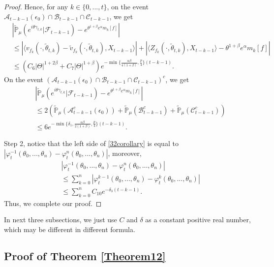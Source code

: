 \documentclass[12pt, a4paper]{amsart}
\theoremstyle{definition}
\numberwithin{equation}{section}
\begin{document}
\begin{proof}
Hence, for any $k\in\{0,...,t\}$, on the event $\mathcal{A}_{t-k-1}(\epsilon_0)\cap\mathcal{B}_{t-k-1}\cap\mathcal{C}_{t-k-1}$, we get
\begin{align*}
   &\left|\mathbb{\tilde{P}}_{\mu}\left(e^{i\theta \gamma_{t,k}}|\mathcal{F}_{t-k-1}\right)-e^{\theta^{1+\beta}e^{\alpha}m_k[f]}\right|\\
   &\leq \left|\langle v_{f_k}(\cdot,\tilde{\theta}_{t,k})-\tilde{v}_{f_k}(\cdot,\tilde{\theta}_{t,k}), X_{t-k-1}\rangle\right|
   +\left|\langle Z_{f_k}(\cdot,\tilde{\theta}_{t,k}),X_{t-k-1}\rangle-\theta^{1+\beta}e^{\alpha}m_k[f]\right|\\
   &\leq (C_6|\Theta|^{1+2\beta}+C_7|\Theta|^{1+\beta}) e^{-\min\{\frac{\alpha\beta}{4(1+\beta)},\frac{p}{4}\}(t-k-1)}.
\end{align*}
On the event $(\mathcal{A}_{t-k-1}(\epsilon_0)\cap\mathcal{B}_{t-k-1}\cap\mathcal{C}_{t-k-1})^c$, we get
\begin{align*}
    &\left|\mathbb{\tilde{P}}_{\mu}\left(e^{i\theta \gamma_{t,k}}|\mathcal{F}_{t-k-1}\right)-e^{\theta^{1+\beta}e^{\alpha}m_k[f]}\right|\\
    &\leq 2(\mathbb{\tilde{P}}_{\mu}(\mathcal{A}^c_{t-k-1}(\epsilon_0))+\mathbb{\tilde{P}}_{\mu}(\mathcal{B}^c_{t-k-1})+\mathbb{\tilde{P}}_{\mu}(\mathcal{C}^c_{t-k-1}))\\
    &\leq 6e^{-\min\{\delta_1,\frac{\alpha\beta}{2(1+\beta)},\frac{p}{4}\}(t-k-1)}.
\end{align*}

Step 2, notice that the left side of \eqref{32corollary} is equal to $\left|\varphi^{-1}_t(\theta_0,...,\theta_n)-\varphi^{n}_t(\theta_0,...,\theta_n)\right|$, moreover,
\begin{align}
    &\left|\varphi^{-1}_t(\theta_0,...,\theta_n)-\varphi^{n}_t(\theta_0,...,\theta_n)\right|
    \\&\leq\sum_{k=0}^n\left|\varphi^{k-1}_t(\theta_0,...,\theta_n)-\varphi^{k}_t(\theta_0,...,\theta_n)\right|
    \\&\leq \sum_{k=0}^n C_{10} e^{-\delta_3(t-k-1)}.
\end{align}
Thus, we complete our proof.
\end{proof}


In next three subsections, we just use $C$ and $\delta$ as a constant positive real number, which may be different in different formula.
\subsection{Proof of Theorem \ref{Theorem12}}
\end{document}
